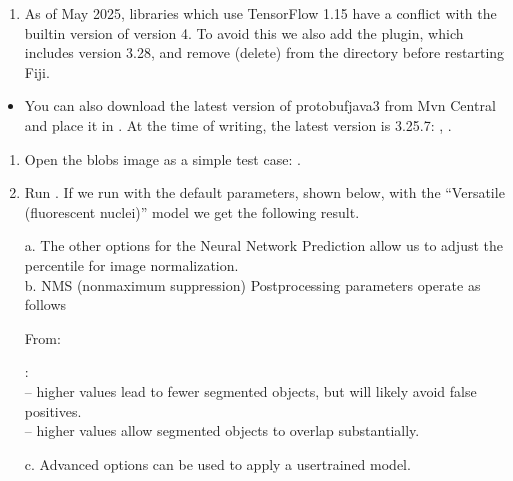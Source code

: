 \documentclass[letterpaper,10pt,english]{jupyterBook}
\begin{document}
\sphinxAtStartPar
{}
\begin{enumerate}
%
\setcounter{enumi}{1}
\item {} 
\sphinxAtStartPar
As of May 2025, libraries which use TensorFlow 1.15 have a conflict with the built\sphinxhyphen{}in version of  version 4. To avoid this we also add the  plugin, which includes  version 3.28, and remove (delete)  from the  directory before restarting Fiji.

\end{enumerate}
\begin{itemize}
\item {} 
\sphinxAtStartPar
You can also download the latest version of protobuf\sphinxhyphen{}java\sphinxhyphen{}3 from Mvn Central and place it in . At the time of writing, the latest version is 3.25.7: , .

\end{itemize}
\begin{enumerate}
%
\setcounter{enumi}{2}
\item {} 
\sphinxAtStartPar
Open the blobs image as a simple test case: .

\item {} 
\sphinxAtStartPar
Run . If we run with the default parameters, shown below, with the “Versatile (fluorescent nuclei)” model we get the following result.

\sphinxAtStartPar
a. The other options for the Neural Network Prediction allow us to adjust the percentile for image normalization.\\
b. NMS (non\sphinxhyphen{}maximum suppression) Postprocessing parameters operate as follows%
\begin{footnote}[1]\sphinxAtStartFootnote
From: 
%
\end{footnote}:\\
\sphinxhyphen{}  – higher values lead to fewer segmented objects, but will likely avoid false positives.\\
\sphinxhyphen{}  – higher values allow segmented objects to overlap substantially.

\sphinxAtStartPar
c. Advanced options can be used to apply a user\sphinxhyphen{}trained model.

\end{enumerate}
\end{document}
